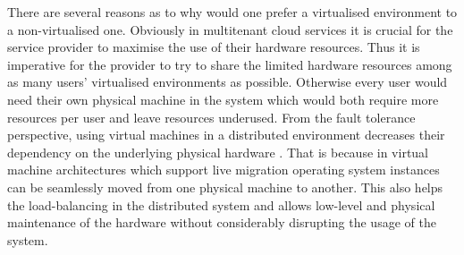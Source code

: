 There are several reasons as to why would one prefer a virtualised environment to a non-virtualised one. Obviously in multitenant cloud services it is crucial for the service provider to maximise the use of their hardware resources. Thus it is imperative for the provider to try to share the limited hardware resources among as many users' virtualised environments as possible. Otherwise every user would need their own physical machine in the system which would both require more resources per user and leave resources underused. From the fault tolerance perspective, using virtual machines in a distributed environment decreases their dependency on the underlying physical hardware \cite{Clark05livemigration}. That is because in virtual machine architectures which support live migration operating system instances can be seamlessly moved from one physical machine to another. This also helps the load-balancing in the distributed system and allows low-level and physical maintenance of the hardware without considerably disrupting the usage of the system. 
	
